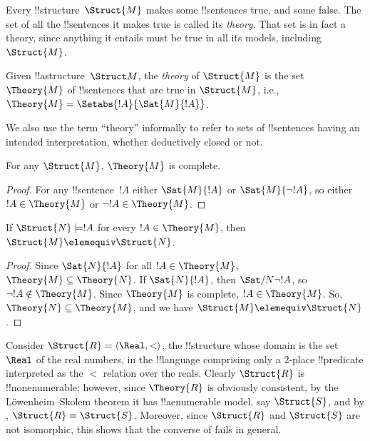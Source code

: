 \documentclass[../../../include/open-logic-section]{subfiles}
\begin{document}

Every !!{structure}~$\Struct{M}$ makes some !!{sentence}s true, and
some false. The set of all the !!{sentence}s it makes true is called
its \emph{theory}. That set is in fact a theory, since anything it
entails must be true in all its models, including~$\Struct{M}$.

\begin{defn}
  Given !!a{structure}~$\Struct M$, the \emph{theory} of
  $\Struct{M}$ is the set $\Theory{M}$ of !!{sentence}s
  that are true in $\Struct{M}$, i.e., $\Theory{M} =
  \Setabs{!A}{\Sat{M}{!A}}$.
\end{defn}

We also use the term ``theory'' informally to refer to sets
of !!{sentence}s having an intended interpretation, whether deductively
closed or not.

\begin{prop}
For any $\Struct{M}$, $\Theory{M}$ is complete.
\end{prop}

\begin{proof}
For any !!{sentence}~$!A$ either $\Sat{M}{!A}$ or $\Sat{M}{\lnot !A}$,
so either $!A \in \Theory{M}$ or $\lnot !A \in \Theory{M}$.
\end{proof}

\begin{prop}
  If $\Struct{N} \models !A$ for every $!A \in \Theory{M}$, then
  $\Struct{M} \elemequiv \Struct{N}$.
\end{prop}

\begin{proof}
Since $\Sat{N}{!A}$ for all $!A \in \Theory{M}$, $\Theory{M} \subseteq
\Theory{N}$. If $\Sat{N}{!A}$, then $\Sat/{N}{\lnot !A}$, so $\lnot !A
\notin \Theory{M}$. Since $\Theory{M}$ is complete, $!A \in
\Theory{M}$. So, $\Theory{N} \subseteq \Theory{M}$, and we have
$\Struct{M} \elemequiv \Struct{N}$.
\end{proof}

\begin{rem}
  Consider $\Struct{R} = \langle\Real, <\rangle$, the !!{structure}
  whose domain is the set $\Real$ of the real numbers, in the !!{language}
  comprising only a 2-place !!{predicate} interpreted as the $<$
  relation over the reals. Clearly $\Struct{R}$ is !!{nonenumerable};
  however, since $\Theory{R}$ is obviously consistent, by the
  L\"owenheim--Skolem theorem it has !!a{enumerable} model, say
  $\Struct{S}$, and by , $\Struct{R}
  \equiv \Struct{S}$. Moreover, since $\Struct{R}$ and $\Struct{S}$
  are not isomorphic, this shows that the converse of
   fails in general.
\end{rem}
\end{document}
